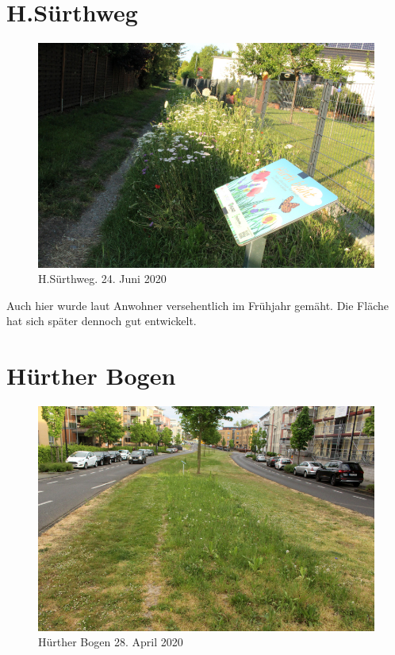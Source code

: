 \documentclass[10pt]{article}
\begin{document}
\section{H.Sürthweg}
\begin{figure}[h!]
  \includegraphics[width=\linewidth]{img/suerthweg/juni.jpg}
  \caption{H.Sürthweg. 24. Juni 2020}
\end{figure}

Auch hier wurde laut Anwohner versehentlich im Frühjahr gemäht.
Die Fläche hat sich später dennoch gut entwickelt. 

\clearpage
\section{Hürther Bogen}
\begin{figure}[h!]
  \includegraphics[width=0.95\linewidth]{img/bogen/april.jpg}
  \caption{Hürther Bogen 28. April 2020}
\end{figure}
\end{document}
